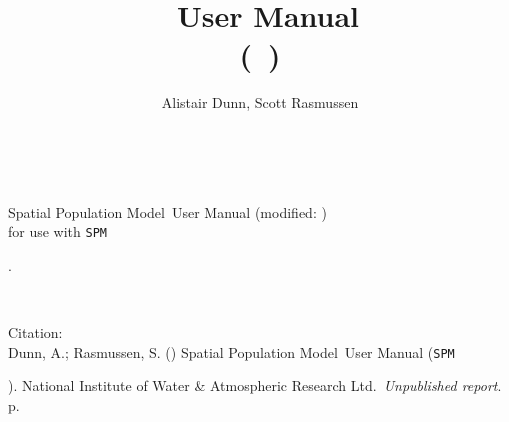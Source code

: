 \documentclass[10pt,twoside,pdftex]{article}
\title{\SPMName\ User Manual \\(\SPM\ \VER)} %
\author{Alistair Dunn, Scott Rasmussen}  %
\date{\DocDate} %
\renewcommand{\headrulewidth}{0pt} %
\newcommand{\DocYear}{\SourceControlYearDoc}
\newcommand{\DocVer}{\SourceControlDateDoc}
\newcommand{\VER}{\begin{small}\end{small}} %
\newcommand{\SPM}{\texttt{SPM}} %
\newcommand{\SPMName}{Spatial Population Model} %
\newcommand{\Organisation}{National Institute of Water \& Atmospheric Research Ltd.} %
\newcommand{\ManualRef}{Dunn, A.; Rasmussen, S. (\DocYear) \SPMName\ User Manual (\SPM\ \VER). \Organisation\ \emph{Unpublished report}. \pageref{LastPage} p.} %
\begin{document}

\maketitle
\thispagestyle{empty} %
~\vfill
\begin{center}
\SPMName\ User Manual (modified: \DocVer) \\ for use with \SPM\ \VER.
\end{center}

\cleardoublepage{}
\fancyfoot[C]{\thepage}
~\vfill
\begin{center}
{Citation:\\ \ManualRef}
\end{center}

\cleardoublepage{}
\begin{spacing}{0.6} %
\tableofcontents
\end{spacing}

\cleardoublepage{}
\renewcommand{\headrulewidth}{0.2pt}
\fancyhead[LE]{\slshape \nouppercase \rightmark} %
\fancyhead[RO]{\slshape \nouppercase \leftmark}  %


\cleardoublepage{}


\cleardoublepage{}


\cleardoublepage{}


\cleardoublepage{}


\cleardoublepage{}


\cleardoublepage{}
\sloppy %
\label{sec:syntax}
\cleardoublepage{}

\cleardoublepage{}

\cleardoublepage{}


\cleardoublepage{}

\end{document}
